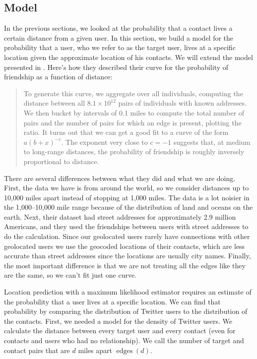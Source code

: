 \documentclass[letterpaper]{article}
\DeclareMathOperator{\edges}{edges}
\newcommand{\flsec}[1]{\subsection{#1}}
\begin{document}
\flsec{Model}
\label{sec:model}

In the previous sections, we looked at the probability that a contact lives a
certain distance from a given user.
%
In this section, we build a model for the probability that a user, who we refer
to as the target user, lives at a specific location given the approximate
location of his contacts.
%
We will extend the model presented in \cite{backstrom2010find}.
%
Here's how they described their curve for the probability of friendship as a
function of distance:
\begin{quote}
To generate this curve, we aggregate over all individuals, computing the
distance between all $8.1 \times 10^{12}$ pairs of individuals with known
addresses.
We then bucket by intervals of 0.1 miles to compute the total number of pairs
and the number of pairs for which an edge is present, plotting the ratio. It
turns out that we can get a good fit to a curve of the form $a(b+x)^{-c}$.
The exponent very close to $c=-1$ suggests that, at medium to long-range
distances, the probability of friendship is roughly inversely proportional to
distance.
\end{quote}

There are several differences between what they did and what we are doing.
%
First, the data we have is from around the world, so we consider distances up
to 10,000 miles apart instead of stopping at 1,000 miles.
%
The data is a lot noisier in the 1,000--10,000 mile range because of the
distribution of land and oceans on the earth.
%
Next, their dataset had street addresses for approximately 2.9 million
Americans, and they used the friendships between users with street addresses to
do the calculation.
%
Since our geolocated users rarely have connections with other geolocated users
we use the geocoded locations of their contacts, which are less accurate than
street addresses since the locations are usually city names.
%
Finally, the most important difference is that we are not treating all the
edges like they are the same, so we can't fit just one curve.

Location prediction with a maximum likelihood estimator requires an estimate of
the probability that a user lives at a specific location.
%
We can find that probability by comparing the distribution of Twitter users to
the distribution of the contacts.
%
First, we needed a model for the density of Twitter users.
%
We calculate the distance between every target user and every contact
(even for contacts and users who had no relationship).
%
We call the number of target and contact pairs that are $d$ miles apart
$\edges(d)$.
\end{document}
